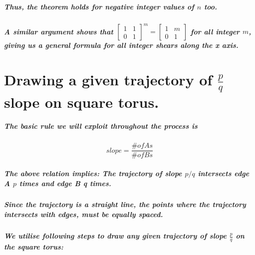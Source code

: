\documentclass{report}
\begin{document}
\paragraph{Thus, the theorem holds for negative integer values of $n$ too.}

\paragraph{A similar argument shows that
$\begin{bmatrix}
1&1\\0&1
\end{bmatrix}^m
=
\begin{bmatrix}
1&m\\0&1
\end{bmatrix}
$ 
for all integer $m$, giving us a general formula for all integer shears along the x axis.
}


\chapter{Drawing a given trajectory of $\frac{p}{q}$ slope on square torus.}


\paragraph{The basic rule we will exploit throughout the process is}

\begin{displaymath}
slope=\frac{\# of As}{\# of Bs}
\end{displaymath}

\paragraph{The above relation implies: The trajectory of slope $p/q$ intersects edge A $p$ times and edge B q times.}

\paragraph{Since the trajectory is a straight line, the points where the trajectory intersects with edges, must be equally spaced.}

\paragraph{We utilise following steps to draw any given trajectory of slope $\frac{p}{q}$ on the square torus:}
\end{document}
